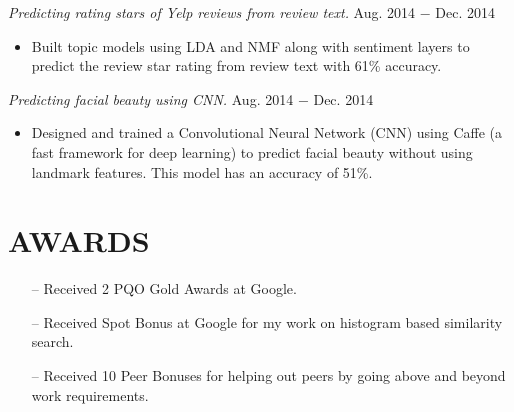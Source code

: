 \documentclass[margin, 2pt]{res} %
\begin{document}
\begin{resume}
{\sl Predicting rating stars of Yelp reviews from review text.} \hfill Aug. 2014 $-$ Dec. 2014

\begin{itemize} \itemsep -2pt %
	\item Built topic models using LDA and NMF along with sentiment layers to predict the review star rating from review text with 61\% accuracy.
\end{itemize}

{\sl Predicting facial beauty using CNN.} \hfill Aug. 2014 $-$ Dec. 2014

\begin{itemize} \itemsep -2pt %
	\item Designed and trained a Convolutional Neural Network (CNN) using Caffe (a fast framework for deep learning) to predict facial beauty without using landmark features. This model has an accuracy of 51\%.
\end{itemize}


\section{AWARDS} 
\begin{itemize}[noitemsep,topsep=0pt,parsep=0pt,partopsep=0pt, leftmargin=*]
  \item[--] Received 2 PQO Gold Awards at Google.
  \item[--] Received Spot Bonus at Google for my work on histogram based similarity search.
  \item[--] Received 10 Peer Bonuses for helping out peers by going above and beyond work requirements.
\end{itemize}




\end{resume}
\end{document}
